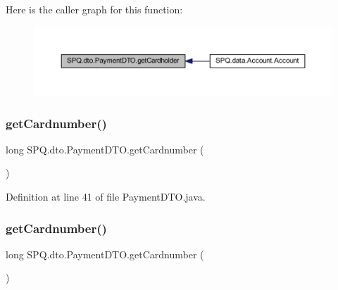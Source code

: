 Here is the caller graph for this function\+:\nopagebreak
\begin{figure}[H]
\begin{center}
\leavevmode
\includegraphics[width=350pt]{class_s_p_q_1_1dto_1_1_payment_d_t_o_ac4812465bc4dd874aad6269fe8486e0b_icgraph}
\end{center}
\end{figure}
\mbox{\label{class_s_p_q_1_1dto_1_1_payment_d_t_o_ac2a8a2ab315f3027f25780a84da0b824}} 
\subsubsection{\texorpdfstring{get\+Cardnumber()}{getCardnumber()}\hspace{0.1cm}{\footnotesize\ttfamily [1/3]}}
{\footnotesize\ttfamily long S\+P\+Q.\+dto.\+Payment\+D\+T\+O.\+get\+Cardnumber (\begin{DoxyParamCaption}{ }\end{DoxyParamCaption})}



Definition at line 41 of file Payment\+D\+T\+O.\+java.

\mbox{\label{class_s_p_q_1_1dto_1_1_payment_d_t_o_ac2a8a2ab315f3027f25780a84da0b824}} 
\subsubsection{\texorpdfstring{get\+Cardnumber()}{getCardnumber()}\hspace{0.1cm}{\footnotesize\ttfamily [2/3]}}
{\footnotesize\ttfamily long S\+P\+Q.\+dto.\+Payment\+D\+T\+O.\+get\+Cardnumber (\begin{DoxyParamCaption}{ }\end{DoxyParamCaption})}



